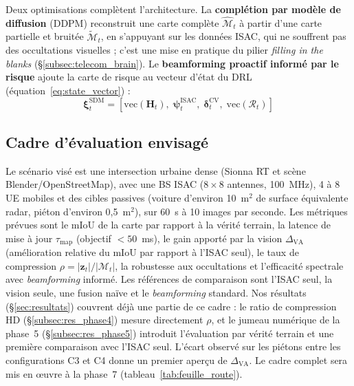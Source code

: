\documentclass[12pt,a4paper,titlepage]{article}
\begin{document}
Deux optimisations complètent l'architecture. La \textbf{complétion par modèle de diffusion} (DDPM) reconstruit une carte complète $\hat{\mathcal{M}}_t$ à partir d'une carte partielle et bruitée $\tilde{\mathcal{M}}_t$, en s'appuyant sur les données ISAC, qui ne souffrent pas des occultations visuelles ; c'est une mise en pratique du pilier \textit{filling in the blanks} (\S\ref{subsec:telecom_brain}). Le \textbf{beamforming proactif informé par le risque} ajoute la carte de risque au vecteur d'état du DRL (équation~\eqref{eq:state_vector}) :
\begin{equation}
    \boldsymbol{\xi}_t^{\text{SDM}} = \left[ \mathrm{vec}(\mathbf{H}_t),\; \boldsymbol{\psi}_t^{\mathrm{ISAC}},\; \boldsymbol{\delta}_t^{\mathrm{CV}},\; \mathrm{vec}(\mathcal{R}_t) \right]
    \label{eq:state_vector_sdm}
\end{equation}

\subsection{Cadre d'évaluation envisagé}
\label{subsec:cadre_evaluation}

Le scénario visé est une intersection urbaine dense (Sionna RT et scène Blender/OpenStreetMap), avec une BS ISAC ($8\times8$ antennes, 100~MHz), 4 à 8 UE mobiles et des cibles passives (voiture d'environ 10~m$^2$ de surface équivalente radar, piéton d'environ 0,5~m$^2$), sur 60~s à 10 images par seconde. Les métriques prévues sont le mIoU de la carte par rapport à la vérité terrain, la latence de mise à jour $\tau_{\text{map}}$ (objectif $<50$~ms), le gain apporté par la vision $\Delta_{\text{VA}}$ (amélioration relative du mIoU par rapport à l'ISAC seul), le taux de compression $\rho = |\mathbf{z}_t|/|\mathcal{M}_t|$, la robustesse aux occultations et l'efficacité spectrale avec \textit{beamforming} informé. Les références de comparaison sont l'ISAC seul, la vision seule, une fusion naïve et le \textit{beamforming} standard. Nos résultats (\S\ref{sec:resultats}) couvrent déjà une partie de ce cadre : le ratio de compression HD (\S\ref{subsec:res_phase4}) mesure directement $\rho$, et le jumeau numérique de la phase~5 (\S\ref{subsec:res_phase5}) introduit l'évaluation par vérité terrain et une première comparaison avec l'ISAC seul. L'écart observé sur les piétons entre les configurations C3 et C4 donne un premier aperçu de $\Delta_{\text{VA}}$. Le cadre complet sera mis en \oe uvre à la phase~7 (tableau~\ref{tab:feuille_route}).

\end{document}
